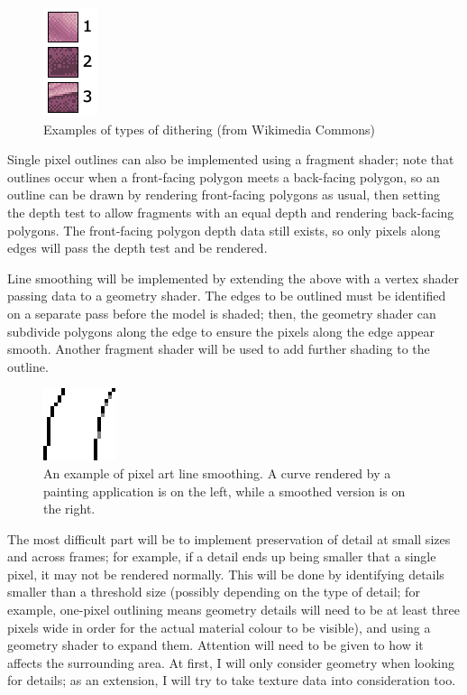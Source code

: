 \documentclass[12pt]{article}
\begin{document}
\begin{figure}[h!]
\centering
\includegraphics{dithering}
\caption{Examples of types of dithering (from Wikimedia Commons)}
\end{figure}

Single pixel outlines can also be implemented using a fragment shader; note that outlines occur when a front-facing polygon meets a back-facing polygon, so an outline can be drawn by rendering front-facing polygons as usual, then setting the depth test to allow fragments with an equal depth and rendering back-facing polygons. The front-facing polygon depth data still exists, so only pixels along edges will pass the depth test and be rendered.

Line smoothing will be implemented by extending the above with a vertex shader passing data to a geometry shader. The edges to be outlined must be identified on a separate pass before the model is shaded; then, the geometry shader can subdivide polygons along the edge to ensure the pixels along the edge appear smooth. Another fragment shader will be used to add further shading to the outline.

\begin{figure}[h!]
\centering
\includegraphics{linesmoothing}
\caption{An example of pixel art line smoothing. A curve rendered by a painting application is on the left, while a smoothed version is on the right.}
\label{fig:linesmoothing}
\end{figure}

The most difficult part will be to implement preservation of detail at small sizes and across frames; for example, if a detail ends up being smaller that a single pixel, it may not be rendered normally. This will be done by identifying details smaller than a threshold size (possibly depending on the type of detail; for example, one-pixel outlining means geometry details will need to be at least three pixels wide in order for the actual material colour to be visible), and using a geometry shader to expand them. Attention will need to be given to how it affects the surrounding area. At first, I will only consider geometry when looking for details; as an extension, I will try to take texture data into consideration too.
\end{document}
